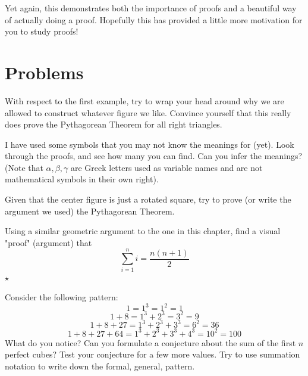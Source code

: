 Yet again, this demonstrates both the importance of proofs and a beautiful way of actually doing a proof. Hopefully this has provided a little more motivation for you to study proofs!

\section{Problems}
\begin{problem}
With respect to the first example, try to wrap your head around why we are allowed to construct whatever figure we like. Convince yourself that this really does prove the Pythagorean Theorem for all right triangles. 
\end{problem}

\begin{problem}
I have used some symbols that you may not know the meanings for (yet). Look through the proofs, and see how many you can find. Can you infer the meanings? (Note that $\alpha, \beta, \gamma$ are Greek letters used as variable names and are not mathematical symbols in their own right). 
\end{problem}

\begin{problem}
Given that the center figure is just a rotated square, try to prove (or write the argument we used) the Pythagorean Theorem. 
\begin{center}
\end{center}
\end{problem}

\begin{problem}
Using a similar geometric argument to the one in this chapter, find a visual 
"proof" (argument) that 
\[
\sum_{i=1}^{n} i = \frac{n(n+1)}{2}
\]
 \hfill $\star$
\end{problem}

\begin{problem}
    Consider the following pattern:
    \[
    1  = 1^3 = 1^2 = 1
    \]
    \[
    1 + 8 = 1^3 + 2^3 = 3^2 = 9
    \]
    \[
    1 + 8 + 27  = 1^3 + 2^3 + 3^3 = 6^2 = 36
    \]
    \[
    1 + 8 + 27 + 64 = 1^3 + 2^3 + 3^3 + 4^3 = 10^2 = 100
    \]
    What do you notice? Can you formulate a conjecture about the sum of the first $n$ perfect cubes? Test your conjecture for a few more values. Try to use summation notation to write down the formal, general, pattern.
\end{problem}